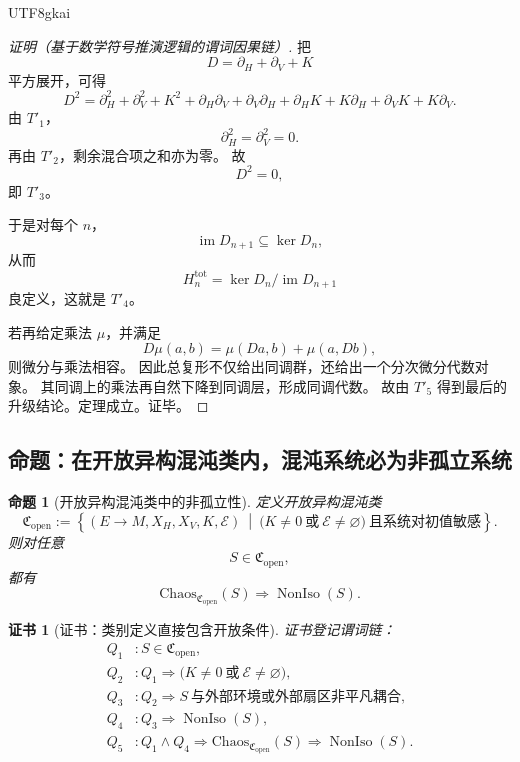 \documentclass[12pt]{article}
\newtheorem{proposition}{命题}[section]
\newtheorem{Certificate}{证书}[section]
\newcommand{\NonIso}{\operatorname{NonIso}}
\newcommand{\Img}{\operatorname{im}}
\newcommand{\Ker}{\operatorname{ker}}
\begin{document}
\begin{CJK*}{UTF8}{gkai}
\begin{proof}[证明（基于数学符号推演逻辑的谓词因果链）]
把
\[
  D=\partial_H+\partial_V+K
\]
平方展开，可得
\[
  D^2
  =
  \partial_H^2+\partial_V^2+K^2
  +
  \partial_H\partial_V+\partial_V\partial_H
  +
  \partial_HK+K\partial_H
  +
  \partial_VK+K\partial_V.
\]
由 $T'_1$，
\[
  \partial_H^2=\partial_V^2=0.
\]
再由 $T'_2$，剩余混合项之和亦为零。
故
\[
  D^2=0,
\]
即 $T'_3$。

于是对每个 $n$，
\[
  \Img D_{n+1}\subseteq \Ker D_n,
\]
从而
\[
  H_n^{\mathrm{tot}}
  =
  \Ker D_n/\Img D_{n+1}
\]
良定义，这就是 $T'_4$。

若再给定乘法 $\mu$，并满足
\[
  D\mu(a,b)=\mu(Da,b)+\mu(a,Db),
\]
则微分与乘法相容。
因此总复形不仅给出同调群，还给出一个分次微分代数对象。
其同调上的乘法再自然下降到同调层，形成同调代数。
故由 $T'_5$ 得到最后的升级结论。定理成立。证毕。
\end{proof}

\subsection{命题：在开放异构混沌类内，混沌系统必为非孤立系统}
\label{subsec:tex43-ch2-proposition-chaos}

\begin{proposition}[开放异构混沌类中的非孤立性]
\label{prop:tex43-open-chaos}
定义开放异构混沌类
\[
  \mathfrak C_{\mathrm{open}}
  :=
  \left\{
    (E\to M,X_H,X_V,K,\mathcal E)
    \ \middle|\
    \bigl(K\neq 0\ \text{或}\ \mathcal E\neq\varnothing\bigr)
    \ \text{且系统对初值敏感}
  \right\}.
\]
则对任意
\[
  S\in \mathfrak C_{\mathrm{open}},
\]
都有
\[
  \mathrm{Chaos}_{\mathfrak C_{\mathrm{open}}}(S)
  \Rightarrow
  \NonIso(S).
\]
\end{proposition}

\begin{Certificate}[证书：类别定义直接包含开放条件]
\label{cert:tex43-open-chaos}
证书登记谓词链：
\[
\begin{aligned}
  Q_1 &: S\in\mathfrak C_{\mathrm{open}},\\
  Q_2 &: Q_1 \Rightarrow \bigl(K\neq 0\ \text{或}\ \mathcal E\neq\varnothing\bigr),\\
  Q_3 &: Q_2 \Rightarrow S\ \text{与外部环境或外部扇区非平凡耦合},\\
  Q_4 &: Q_3 \Rightarrow \NonIso(S),\\
  Q_5 &: Q_1\wedge Q_4 \Rightarrow \mathrm{Chaos}_{\mathfrak C_{\mathrm{open}}}(S)\Rightarrow \NonIso(S).
\end{aligned}
\]
\end{Certificate}


\end{CJK*}
\end{document}
